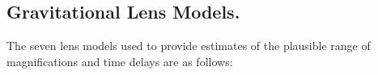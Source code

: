 \subsection{Gravitational Lens Models.}\label{sec:LensingModels}



The seven lens models used to provide estimates of the plausible range
of magnifications and time delays are as follows:

